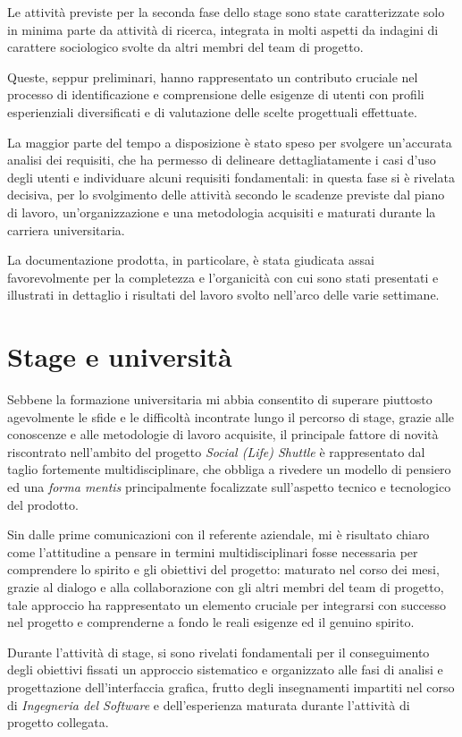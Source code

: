Le attività previste per la seconda fase dello stage sono state caratterizzate solo in minima parte da attività di ricerca, integrata in molti aspetti da indagini di carattere sociologico svolte da altri membri del team di progetto.

Queste, seppur preliminari, hanno rappresentato un contributo cruciale nel processo di identificazione e comprensione delle esigenze di utenti con profili esperienziali diversificati e di valutazione delle scelte progettuali effettuate.

La maggior parte del tempo a disposizione è stato speso per svolgere un'accurata analisi dei requisiti, che ha permesso di delineare dettagliatamente i casi d'uso degli utenti e individuare alcuni requisiti fondamentali: in questa fase si è rivelata decisiva, per lo svolgimento delle attività secondo le scadenze previste dal piano di lavoro, un'organizzazione e una metodologia acquisiti e maturati durante la carriera universitaria.

La documentazione prodotta, in particolare, è stata giudicata assai favorevolmente per la completezza e l'organicità con cui sono stati presentati e illustrati in dettaglio i risultati del lavoro svolto nell'arco delle varie settimane.

\section{Stage e università}
Sebbene la formazione universitaria mi abbia consentito di superare piuttosto agevolmente le sfide e le difficoltà incontrate lungo il percorso di stage, grazie alle conoscenze e alle metodologie di lavoro acquisite, il principale fattore di novità riscontrato nell'ambito del progetto \textit{Social (Life) Shuttle} è rappresentato dal taglio fortemente multidisciplinare, che obbliga a rivedere un modello di pensiero ed una \textit{forma mentis} principalmente focalizzate sull'aspetto tecnico e tecnologico del prodotto.

Sin dalle prime comunicazioni con il referente aziendale, mi è risultato chiaro come l'attitudine a pensare in termini multidisciplinari fosse necessaria per comprendere lo spirito e gli obiettivi del progetto: maturato nel corso dei mesi, grazie al dialogo e alla collaborazione con gli altri membri del team di progetto, tale approccio ha rappresentato un elemento cruciale per integrarsi con successo nel progetto e comprenderne a fondo le reali esigenze ed il genuino spirito.

Durante l'attività di stage, si sono rivelati fondamentali per il conseguimento degli obiettivi fissati un approccio sistematico e organizzato alle fasi di analisi e progettazione dell'interfaccia grafica, frutto degli insegnamenti impartiti nel corso di \textit{Ingegneria del Software} e dell'esperienza maturata durante l'attività di progetto collegata.

